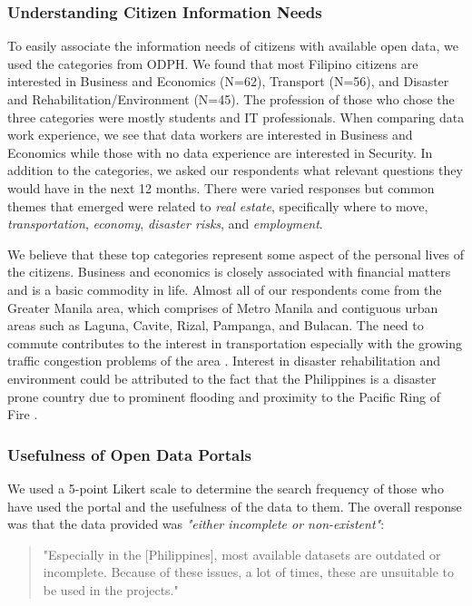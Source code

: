 \documentclass{sigchi}
\begin{document}
\subsubsection{Understanding Citizen Information Needs}
To easily associate the information needs of citizens with available open data, we used the categories from ODPH. We found that most Filipino citizens are interested in Business and Economics (N=62), Transport (N=56), and Disaster and Rehabilitation/Environment (N=45). The profession of those who chose the three categories were mostly students and IT professionals. When comparing data work experience, we see that data workers are interested in Business and Economics while those with no data experience are interested in Security. In addition to the categories, we asked our respondents what relevant questions they would have in the next 12 months. There were varied responses but common themes that emerged were related to \textit{real estate}, specifically where to move, \textit{transportation}, \textit{economy}, \textit{disaster risks}, and \textit{employment}. 

We believe that these top categories represent some aspect of the personal lives of the citizens. Business and economics is closely associated with financial matters and is a basic commodity in life. Almost all of our respondents come from the Greater Manila area, which comprises of Metro Manila and contiguous urban areas such as Laguna, Cavite, Rizal, Pampanga, and Bulacan. The need to commute contributes to the interest in transportation especially with the growing traffic congestion problems of the area \cite{Traffic55:online, Expertsa90:online}. Interest in disaster rehabilitation and environment could be attributed to the fact that the Philippines is a disaster prone country due to prominent flooding and proximity to the Pacific Ring of Fire \cite{WhyPhili58:online}.

\subsubsection{Usefulness of Open Data Portals}
We used a 5-point Likert scale to determine the search frequency of those who have used the portal and the usefulness of the data to them. The overall response was that the data provided was \textit{"either incomplete or non-existent"}: 

\begin{quote}
  "Especially in the [Philippines], most available datasets are outdated or incomplete. Because of these issues, a lot of times, these are unsuitable to be used in the projects."
\end{quote}
\end{document}
